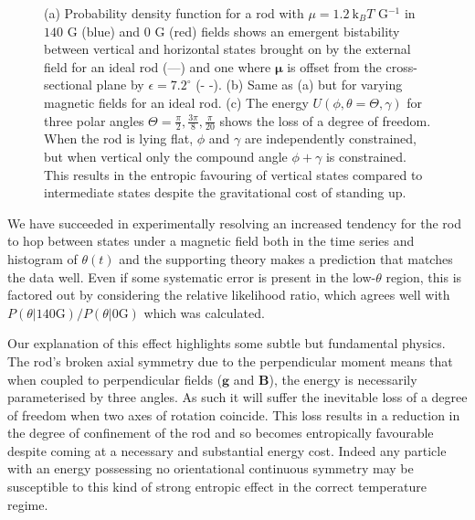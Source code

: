 \documentclass[aps,prl,twocolumn,superscriptaddress]{revtex4-1}
\newcommand{\vcrm}[1]{\mathbf{#1}}
\newcommand{\vc}[1]{\boldsymbol{#1}}
\newcommand{\kk}{\mathrm{k}_B}
\begin{document}
\begin{figure}
    \caption{\footnotesize (a) Probability density function for a rod with $\mu=1.2\ \kk T$ G$^{-1}$ in $140$ G (blue) and $0$ G (red) fields shows an emergent bistability between vertical and horizontal states brought on by the external field for an ideal rod (---) and one where $\vc{\mu}$ is offset from the cross-sectional plane by $\epsilon=7.2^\circ$ (- -). (b) Same as (a) but for varying magnetic fields for an ideal rod. (c) The energy $U(\phi,\theta=\Theta,\gamma)$ for three polar angles $\Theta=\frac{\pi}{2},\frac{3\pi}{8},\frac{\pi}{20}$ shows the loss of a degree of freedom. When the rod is lying flat, $\phi$ and $\gamma$ are independently constrained, but when vertical only the compound angle $\phi+\gamma$ is constrained. This results in the entropic favouring of vertical states compared to intermediate states despite the gravitational cost of standing up. \label{theory}}
\end{figure}
%
%
%
%
%
%
%
 We have succeeded in experimentally resolving an increased tendency for the rod to hop between states under a magnetic field both in the time series and histogram of $\theta(t)$ and the supporting theory makes a prediction that matches the data well. Even if some systematic error is present in the low-$\theta$ region, this is factored out by considering the relative likelihood ratio, which agrees well with $P(\theta|140 \text{G})/P(\theta|0 \text{G})$ which was calculated.

Our explanation of this effect highlights some subtle but fundamental physics. The rod's broken axial symmetry due to the perpendicular moment means that when coupled to perpendicular fields ($\vcrm{g}$ and $\vcrm{B}$), the energy is necessarily parameterised by three angles. As such it will suffer the inevitable loss of a degree of freedom when two axes of rotation coincide. This loss results in a reduction in the degree of confinement of the rod and so becomes entropically favourable despite coming at a necessary and substantial energy cost.  Indeed any particle with an energy possessing no orientational continuous symmetry may be susceptible to this kind of strong entropic effect in the correct temperature regime.
  
\end{document}
